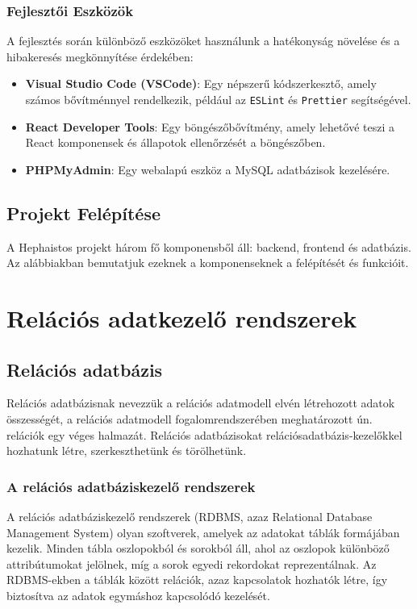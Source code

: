 \documentclass[colorlinks]{thesis-kando}
\theoremstyle{definition}
\theoremstyle{remark}
\begin{document}
\subsection{Fejlesztői Eszközök}
A fejlesztés során különböző eszközöket használunk a hatékonyság növelése és a hibakeresés megkönnyítése érdekében:
\begin{itemize}
    \item \textbf{Visual Studio Code (VSCode)}: Egy népszerű kódszerkesztő, amely számos bővítménnyel rendelkezik, például az \texttt{ESLint} és \texttt{Prettier} segítségével.
    \item \textbf{React Developer Tools}: Egy böngészőbővítmény, amely lehetővé teszi a React komponensek és állapotok ellenőrzését a böngészőben.
    \item \textbf{PHPMyAdmin}: Egy webalapú eszköz a MySQL adatbázisok kezelésére.
\end{itemize}

\section{Projekt Felépítése}
A Hephaistos projekt három fő komponensből áll: backend, frontend és adatbázis. Az alábbiakban bemutatjuk ezeknek a komponenseknek a felépítését és funkcióit.

\chapter{Relációs adatkezelő rendszerek}

\section{Relációs adatbázis}

	Relációs adatbázisnak nevezzük a relációs adatmodell elvén létrehozott adatok összességét, a relációs adatmodell fogalomrendszerében meghatározott ún. relációk egy véges halmazát. Relációs adatbázisokat relációsadatbázis-kezelőkkel hozhatunk létre, szerkeszthetünk és törölhetünk.

\subsection{A relációs adatbáziskezelő rendszerek}

A relációs adatbáziskezelő rendszerek (RDBMS, azaz Relational Database Management System) olyan szoftverek, amelyek az adatokat táblák formájában kezelik. Minden tábla oszlopokból és sorokból áll, ahol az oszlopok különböző attribútumokat jelölnek, míg a sorok egyedi rekordokat reprezentálnak. Az RDBMS-ekben a táblák között relációk, azaz kapcsolatok hozhatók létre, így biztosítva az adatok egymáshoz kapcsolódó kezelését.
\end{document}

